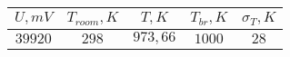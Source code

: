 \begin{tabular}{| c | c | c | c | c |}
\hline
$U, mV$ & $T_{room}, K$ & $T, K$ & $T_{br}, K$ & $ \sigma_{T}, K$\\
\hline
$39920$ & $298$ & $973,66$ & $1000$ & $ 28 $\\
\hline
\end{tabular}
